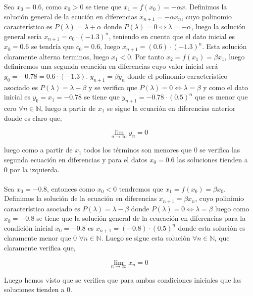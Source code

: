 \documentclass{article}
\begin{document}
Sea $x_0 = 0.6$, como $x_0 > 0$ se tiene que $x_1 = f(x_0) = -\alpha x$. Definimos la solución general de la ecución en diferencias $x_{n+1} = -\alpha x_n$, cuyo polinomio característico es $P(\lambda)=\lambda + \alpha$ donde $P(\lambda) = 0 \Leftrightarrow \lambda = -\alpha$, luego la solución general sería $x_{n+1} = c_0\cdot(-1.3)^n$, teniendo en cuenta que el dato inicial es $x_0 = 0.6$ se tendría que $c_0 = 0.6$, luego $x_{n+1} = (0.6)\cdot(-1.3)^n$. Esta solución claramente alterna terminos, luego $x_1 < 0$. Por tanto $x_2 = f(x_1) = \beta x_1$, luego definiremos una segunda ecuación en diferencias cuyo valor inicial será $y_0 = -0.78 = 0.6\cdot(-1.3)$. $y_{n+1} = \beta y_n$ donde el polinomio característico asociado es $P(\lambda)= \lambda - \beta$ y se verifica que $P(\lambda) = 0 \Leftrightarrow \lambda = \beta$ y como el dato inicial es $y_0 = x_1 = -0.78$ se tiene que $y_{n+1} = -0.78\cdot(0.5)^n$ que es menor que cero $\forall n \in \mathbb{N}$, luego a partir de $x_1$ se sigue la ecuación en diferencias anterior donde es claro que,

\begin{equation*}
\lim_{n \to \infty} y_n = 0
\end{equation*}

luego como a partir de $x_1$ todos los términos son menores que 0 se verifica las segunda ecuación en diferencias y para el datos $x_0 = 0.6$ las soluciones tienden a 0 por la izquierda. \\ \\

Sea $x_0 = -0.8$, entonces como $x_0 < 0$ tendremos que $x_1 = f(x_0) = \beta x_0$. Definimos la solución de la ecuación en diferencias $x_{n+1} = \beta x_n$, cuyo polinimio característico asociado es $P(\lambda) = \lambda - \beta$ donde $P(\lambda)= 0 \Leftrightarrow \lambda = \beta$ luego como $x_0 = -0.8$ se tiene que la solución general de la ecucación en diferencias para la condición inicial $x_0=-0.8$ es $x_{n+1} = (-0.8)\cdot(0.5)^n$ donde esta solución es claramente menor que 0 $\forall n \in \mathbb{N}$. Luego se sigue esta solución $\forall n \in \mathbb{N}$, que claramente verifica que,

\begin{equation*}
\lim_{n \to \infty} x_n = 0
\end{equation*}

Luego hemos visto que se verifica que para ambas condiciones iniciales que las soluciones tienden a 0. \\ \\
\end{document}
